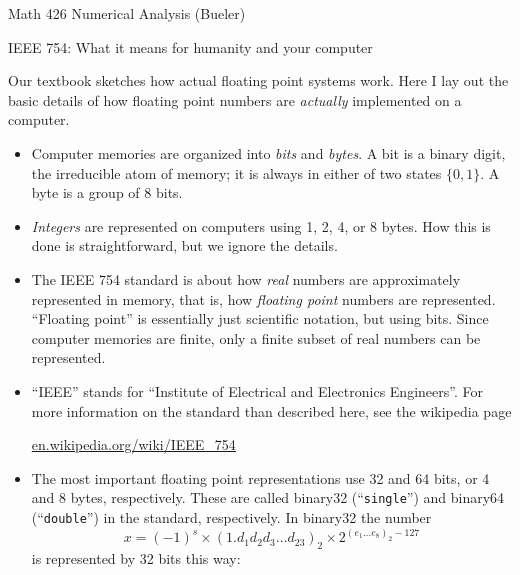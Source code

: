 \documentclass[11pt]{amsart}
\begin{document}
\scriptsize \noindent Math 426 Numerical Analysis (Bueler) \hfill {}
\normalsize

\medskip\bigskip
\LARGE\centerline{IEEE 754: What it means for humanity and your computer}

\bigskip
\normalsize

\thispagestyle{empty}

Our textbook sketches how actual floating point systems work.  Here I lay out the basic details of how floating point numbers are \emph{actually} implemented on a computer.

\bigskip
\begin{itemize}
\setlength\itemsep{1em}
\item Computer memories are organized into \emph{bits} and \emph{bytes}.  A bit is a binary digit, the irreducible atom of memory; it is always in either of two states $\{0,1\}$.  A byte is a group of 8 bits.  

\item \emph{Integers} are represented on computers using 1, 2, 4, or 8 bytes.  How this is done is straightforward, but we ignore the details.

\item The IEEE 754 standard is about how \emph{real} numbers are approximately represented in memory, that is, how \emph{floating point} numbers are represented.  ``Floating point'' is essentially just scientific notation, but using bits.  Since computer memories are finite, only a finite subset of real numbers can be represented.

\item ``IEEE'' stands for ``Institute of Electrical and Electronics Engineers''.  For more information on the standard than described here, see the wikipedia page

 \centerline{\url{en.wikipedia.org/wiki/IEEE_754}}


\item The most important floating point representations use 32 and 64 bits, or 4 and 8 bytes, respectively.  These are called binary32 (``\texttt{single}'') and binary64 (``\texttt{double}'') in the standard, respectively.  In binary32 the number
       $$x = (-1)^s \times \left(1.d_1 d_2 d_3 \dots d_{23}\right)_{2} \times 2^{\left(e_1\dots e_8\right)_2 - 127}$$
is represented by 32 bits this way:

\medskip
\hspace{-30mm}


\end{itemize}
\end{document}
